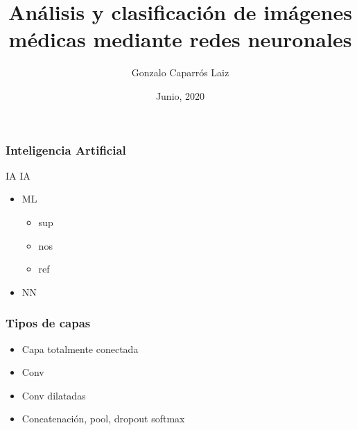 \documentclass{beamer}
\title[Clasificación de imágenes médicas]{Análisis y clasificación de imágenes médicas mediante redes neuronales} %
\author{Gonzalo Caparrós Laiz} %
\institute[UM] %
{
Universidad de Murcia \\ %
\medskip
\textit{gonzalo.caparrosl@um.es} %
}
\date{Junio, 2020} %
\begin{document}
\begin{frame}
\titlepage %
\end{frame}



\begin{frame}
\frametitle{Inteligencia Artificial}

\begin{block}{IA}
IA
\end{block}

\begin{itemize}
\item ML
\begin{itemize}
\item sup
\item nos
\item ref
\end{itemize}
\item NN
\end{itemize}

\end{frame}



\begin{frame}
\frametitle{Tipos de capas}

\begin{itemize}
\item Capa totalmente conectada
\item Conv
\item Conv dilatadas
\item Concatenación, pool, dropout softmax
\end{itemize}

\end{frame}
\end{document}
